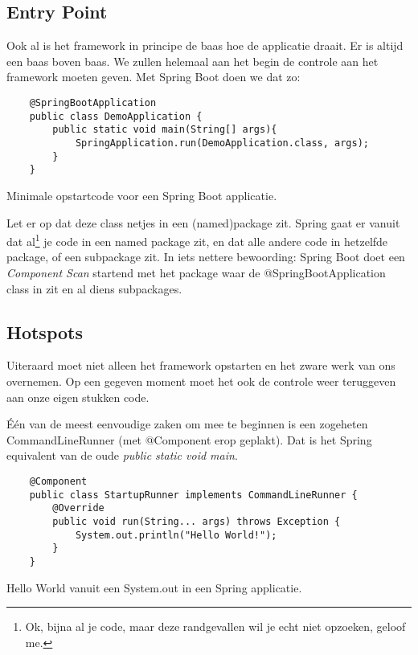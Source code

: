 \subsection{Entry Point}

Ook al is het framework in principe de baas hoe de applicatie draait. Er is altijd een baas boven baas. 
We zullen helemaal aan het begin de controle aan het framework moeten geven. Met Spring Boot doen we dat zo:

\begin{listing}[H]
    \begin{verbatim}
    @SpringBootApplication
    public class DemoApplication {
        public static void main(String[] args){
            SpringApplication.run(DemoApplication.class, args);
        }
    }
    \end{verbatim}
    \caption{Minimale opstartcode voor een Spring Boot applicatie.}
    \label{code:springstart}
\end{listing}

Let er op dat deze class netjes in een (named)package zit. Spring gaat er vanuit dat 
al\footnote{Ok, bijna al je code, maar deze randgevallen wil je echt niet opzoeken, geloof me.} 
je code in een named package zit, en dat alle andere code in hetzelfde package, of een subpackage zit.
In iets nettere bewoording: Spring Boot doet een \emph{Component Scan} startend met het package waar 
de @SpringBootApplication class in zit en al diens subpackages.

\subsection{Hotspots}

Uiteraard moet niet alleen het framework opstarten en het zware werk van ons overnemen. Op een gegeven moment
moet het ook de controle weer teruggeven aan onze eigen stukken code.

Één van de meest eenvoudige zaken om mee te beginnen is een zogeheten CommandLineRunner (met @Component erop geplakt). 
Dat is het Spring equivalent van de oude \emph{public static void main}.

\begin{listing}[H]
    \begin{verbatim}
    @Component
    public class StartupRunner implements CommandLineRunner {
        @Override
        public void run(String... args) throws Exception {
            System.out.println("Hello World!");
        }
    }
    \end{verbatim}
    \caption{Hello World vanuit een System.out in een Spring applicatie.}
    \label{code:springhello}
\end{listing}

